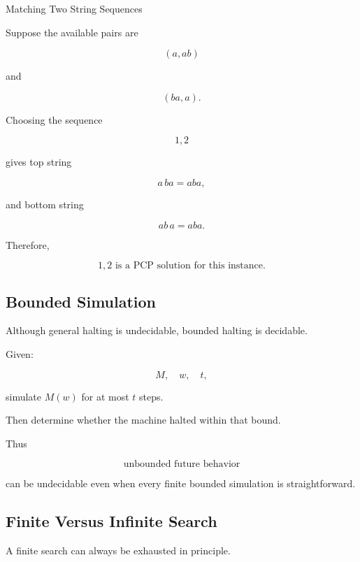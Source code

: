 \begin{workedexamplebox}{Matching Two String Sequences}

Suppose the available pairs are

\[
(a,ab)
\]

and

\[
(ba,a).
\]

Choosing the sequence

\[
1,2
\]

gives top string

\[
a\,ba
=
aba,
\]

and bottom string

\[
ab\,a
=
aba.
\]

Therefore,

\begin{answerbox}
\[
\boxed{
1,2
\text{ is a PCP solution for this instance}.
}
\]
\end{answerbox}

\end{workedexamplebox}

\subsection{Bounded Simulation}
\label{subsec:bounded-simulation}

Although general halting is undecidable, bounded halting is decidable.

Given:

\[
\boxed{
M,
\quad
w,
\quad
t,
}
\]

simulate \(M(w)\) for at most \(t\) steps.

Then determine whether the machine halted within that bound.

Thus

\[
\boxed{
\text{unbounded future behavior}
}
\]

can be undecidable even when every finite bounded simulation is
straightforward.

\subsection{Finite Versus Infinite Search}
\label{subsec:finite-infinite-search}

A finite search can always be exhausted in principle.

